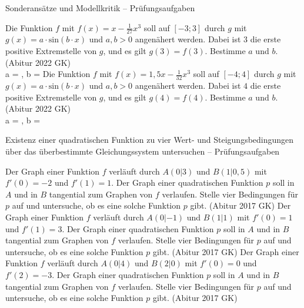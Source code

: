 \begin{aufgabe}{Sonderansätze und Modellkritik – Prüfungsaufgaben}
\begin{teile}
\teil Die Funktion $f$ mit $f(x) = x - \frac{1}{27}x^3$ soll auf $[-3; 3]$ durch $g$ mit $g(x) = a \cdot \mathrm{sin}(b \cdot x)$ und $a, b > 0$ angenähert werden. Dabei ist $3$ die erste positive Extremstelle von $g$, und es gilt $g(3) = f(3)$. Bestimme $a$ und $b$. \hfill (Abitur 2022 GK) \\ a = \leerfeld , b = \leerfeld
\teil Die Funktion $f$ mit $f(x) = 1{,}5x - \frac{1}{32}x^3$ soll auf $[-4; 4]$ durch $g$ mit $g(x) = a \cdot \mathrm{sin}(b \cdot x)$ und $a, b > 0$ angenähert werden. Dabei ist $4$ die erste positive Extremstelle von $g$, und es gilt $g(4) = f(4)$. Bestimme $a$ und $b$. \hfill (Abitur 2022 GK) \\ a = \leerfeld , b = \leerfeld
\end{teile}
\end{aufgabe}

\begin{aufgabe}{Existenz einer quadratischen Funktion zu vier Wert- und Steigungsbedingungen über das überbestimmte Gleichungssystem untersuchen – Prüfungsaufgaben}
\begin{teile}
\teil Der Graph einer Funktion $f$ verläuft durch $A(0|3)$ und $B(1|0{,}5)$ mit $f'(0) = -2$ und $f'(1) = 1$. Der Graph einer quadratischen Funktion $p$ soll in $A$ und in $B$ tangential zum Graphen von $f$ verlaufen. Stelle vier Bedingungen für $p$ auf und untersuche, ob es eine solche Funktion $p$ gibt. \hfill (Abitur 2017 GK)
\teil Der Graph einer Funktion $f$ verläuft durch $A(0|-1)$ und $B(1|1)$ mit $f'(0) = 1$ und $f'(1) = 3$. Der Graph einer quadratischen Funktion $p$ soll in $A$ und in $B$ tangential zum Graphen von $f$ verlaufen. Stelle vier Bedingungen für $p$ auf und untersuche, ob es eine solche Funktion $p$ gibt. \hfill (Abitur 2017 GK)
\teil Der Graph einer Funktion $f$ verläuft durch $A(0|4)$ und $B(2|0)$ mit $f'(0) = 0$ und $f'(2) = -3$. Der Graph einer quadratischen Funktion $p$ soll in $A$ und in $B$ tangential zum Graphen von $f$ verlaufen. Stelle vier Bedingungen für $p$ auf und untersuche, ob es eine solche Funktion $p$ gibt. \hfill (Abitur 2017 GK)
\end{teile}
\end{aufgabe}
